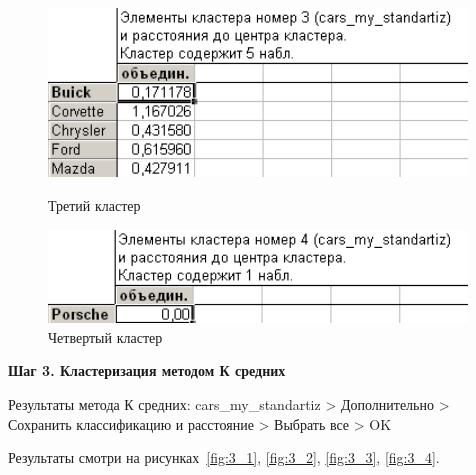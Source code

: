 \begin{figure}[!h]
  \centering
  \begin{minipage}{0.49\textwidth}
    \centering

    \includegraphics[width=0.99\textwidth]
    {inc/cars_my/2.7.PNG}

    \caption{Третий кластер}
    \label{fig:2_7}
  \end{minipage}
  \begin{minipage}{0.49\textwidth}
    \centering

    \includegraphics[width=0.99\textwidth]
    {inc/cars_my/2.8.PNG}

    \caption{Четвертый кластер}
    \label{fig:2_8}
  \end{minipage}
\end{figure}

\newpage

\begin{center}
  \textbf{Шаг 3. Кластеризация методом К средних}
\end{center}

Результаты метода К средних: cars\_my\_standartiz > Дополнительно > Сохранить классификацию и расстояние > Выбрать все > OK

Результаты смотри на рисунках~\ref{fig:3_1}, \ref{fig:3_2}, \ref{fig:3_3}, \ref{fig:3_4}.

